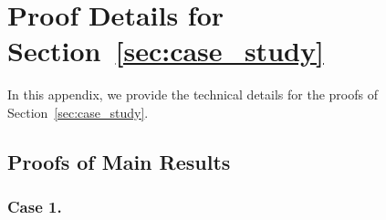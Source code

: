 \documentclass[10pt]{article}
\theoremstyle{definition}
\theoremstyle{definition}
\numberwithin{equation}{section}
\newcommand{\Unif}{\mathrm{Unif}}
\begin{document}




\section{Proof Details for Section~\ref{sec:case_study}}\label{app:case_study}

In this appendix, we provide the technical details for the proofs of Section~\ref{sec:case_study}.

\subsection{Proofs of Main Results}

\subsubsection*{Case 1.}
\end{document}
